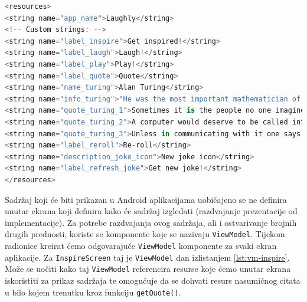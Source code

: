 \documentclass[11pt,a4paper,twoside]{article}
\begin{document}
\begin{lstlisting}[caption={Resursi - values/strings.xml}, label={lst:resources-strings}, language=Kotlin]
<resources>
<string name="app_name">Laughly</string>
<!-- Custom strings: -->
<string name="label_inspire">Get inspired!</string>
<string name="label_laugh">Laugh!</string>
<string name="label_play">Play!</string>
<string name="label_quote">Quote</string>
<string name="name_turing">Alan Turing</string>
<string name="info_turing">"He was the most important mathematician of the second world war. He helped to break the German's Enigma code at Blatchley Park, by designing a computer to decipher the German messages called the Bombe. The most important effects of this revolutionary invention were:\n - Shortening the length of the war: by decoding the German's messages Blatchley Park's team was able to identify the position of all Nazi's boats so the Royal Navy was able to protect English naval fleet from u-boats's attacks.\n - Saving millions lives: the avoided attacks permit a lot of people to stay in life. Turing's team, on the other hand, had to avoid that German discover that  Enigma had been decrypted. An electromechanical device that helped the code-breakers to calculate the key of the day the German were using on their Enigma machine.Using a menu provided by the codebreaking team from a crib (plaintext that corresponded to ciphertext), the Bombe operators could quickly set up the machine and let it calculate possible Enigma settings.\n  After the war Alan Turing came up with Turing Test, a method to test artificial intelligence.Persecuted for homosexual acts, he committed suicide in 1954.\n"</string>
<string name="quote_turing_1">Sometimes it is the people no one imagines anything of who do the things that no one can imagine.</string>
<string name="quote_turing_2">A computer would deserve to be called intelligent if it could deceive a human into believing that it was human.</string>
<string name="quote_turing_3">Unless in communicating with it one says exactly what one means, trouble is bound to result.</string>
<string name="label_reroll">Re-roll</string>
<string name="description_joke_icon">New joke icon</string>
<string name="label_refresh_joke">Get new joke!</string>
</resources>
\end{lstlisting}

Sadržaj koji će biti prikazan u Android aplikacijama uobičajeno se ne definira unutar ekrana koji definira kako će sadržaj izgledati (razdvajanje prezentacije od implementacije). Za potrebe razdvajanja ovog sadržaja, ali i ostvarivanje brojnih drugih prednosti, koriste se komponente koje se nazivaju \texttt{ViewModel}. Tijekom radionice kreirat ćemo odgovarajuće \texttt{ViewModel} komponente za svaki ekran aplikacije. Za \texttt{InspireScreen} taj je \texttt{ViewModel} dan izlistanjem \ref{lst:vm-inspire}. Može se uočiti kako taj \texttt{ViewModel} referencira resurse koje ćemo unutar ekrana iskoristiti za prikaz sadržaja te omogućuje da se dohvati resurs nasumičnog citata u bilo kojem trenutku kroz funkciju \texttt{getQuote()}.
\end{document}

